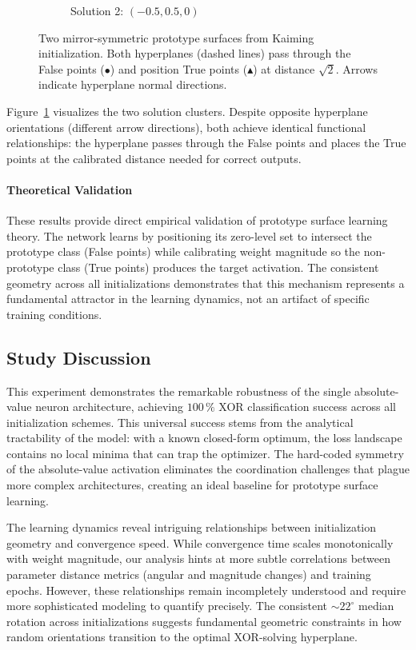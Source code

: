 \begin{figure}[ht]
\begin{subfigure}{0.46\textwidth}
   \caption{Solution 2: $(-0.5, 0.5, 0)$}
 \end{subfigure}
 \caption{Two mirror-symmetric prototype surfaces from Kaiming initialization. Both hyperplanes (dashed lines) pass through the False points ($\bullet$) and position True points ($\blacktriangle$) at distance $\sqrt{2}$. Arrows indicate hyperplane normal directions.}
 \label{fig:abs1-hyperplanes}
\end{figure}

Figure~\ref{fig:abs1-hyperplanes} visualizes the two solution clusters. Despite opposite hyperplane orientations (different arrow directions), both achieve identical functional relationships: the hyperplane passes through the False points and places the True points at the calibrated distance needed for correct outputs.

\paragraph{Theoretical Validation}
These results provide direct empirical validation of prototype surface learning theory. The network learns by positioning its zero-level set to intersect the prototype class (False points) while calibrating weight magnitude so the non-prototype class (True points) produces the target activation. The consistent geometry across all initializations demonstrates that this mechanism represents a fundamental attractor in the learning dynamics, not an artifact of specific training conditions.


\subsection*{Study Discussion}

This experiment demonstrates the remarkable robustness of the single absolute-value neuron architecture, achieving $100\,\%$ XOR classification success across all initialization schemes. This universal success stems from the analytical tractability of the model: with a known closed-form optimum, the loss landscape contains no local minima that can trap the optimizer. The hard-coded symmetry of the absolute-value activation eliminates the coordination challenges that plague more complex architectures, creating an ideal baseline for prototype surface learning.

The learning dynamics reveal intriguing relationships between initialization geometry and convergence speed. While convergence time scales monotonically with weight magnitude, our analysis hints at more subtle correlations between parameter distance metrics (angular and magnitude changes) and training epochs. However, these relationships remain incompletely understood and require more sophisticated modeling to quantify precisely. The consistent $\sim22^\circ$ median rotation across initializations suggests fundamental geometric constraints in how random orientations transition to the optimal XOR-solving hyperplane.

